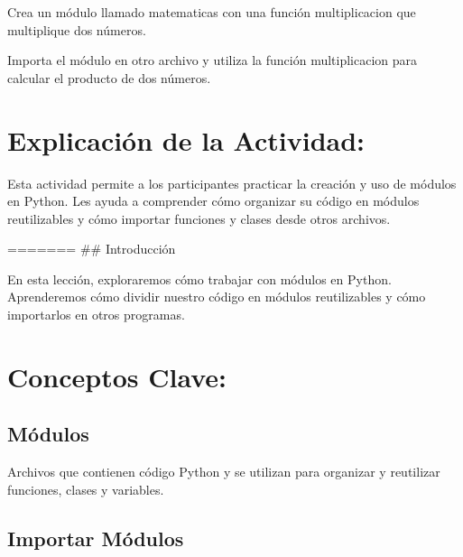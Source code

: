 \documentclass[
  a4paper,
  onepage,
  openany]{scrreprt}
\begin{document}
\begin{tcolorbox}[enhanced jigsaw, breakable, opacityback=0, toptitle=1mm, coltitle=black, toprule=.15mm, rightrule=.15mm, colframe=quarto-callout-important-color-frame, opacitybacktitle=0.6, arc=.35mm, title=\textcolor{quarto-callout-important-color}{\faExclamation}\hspace{0.5em}{Actividad Práctica:}, titlerule=0mm, colbacktitle=quarto-callout-important-color!10!white, bottomtitle=1mm, bottomrule=.15mm, colback=white, left=2mm, leftrule=.75mm]

Crea un módulo llamado matematicas con una función multiplicacion que
multiplique dos números.

Importa el módulo en otro archivo y utiliza la función multiplicacion
para calcular el producto de dos números.

\end{tcolorbox}

\hypertarget{explicaciuxf3n-de-la-actividad-56}{%
\section{Explicación de la
Actividad:}\label{explicaciuxf3n-de-la-actividad-56}}

Esta actividad permite a los participantes practicar la creación y uso
de módulos en Python. Les ayuda a comprender cómo organizar su código en
módulos reutilizables y cómo importar funciones y clases desde otros
archivos.

======= \#\# Introducción

En esta lección, exploraremos cómo trabajar con módulos en Python.
Aprenderemos cómo dividir nuestro código en módulos reutilizables y cómo
importarlos en otros programas.

\hypertarget{conceptos-clave-59}{%
\section{Conceptos Clave:}\label{conceptos-clave-59}}

\hypertarget{muxf3dulos-1}{%
\subsection{Módulos}\label{muxf3dulos-1}}

Archivos que contienen código Python y se utilizan para organizar y
reutilizar funciones, clases y variables.

\hypertarget{importar-muxf3dulos-1}{%
\subsection{Importar Módulos}\label{importar-muxf3dulos-1}}
\end{document}
